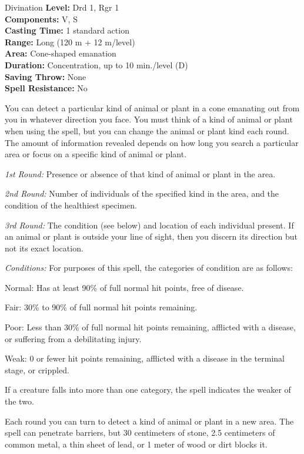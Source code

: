 {Divination}
{
	\textbf{Level:}
	Drd 1, Rgr 1\\
	\textbf{Components:}
	V, S\\
	\textbf{Casting Time:}
	1 standard action\\
	\textbf{Range:}
	Long (120 m + 12 m/level)\\
	\textbf{Area:}
	Cone-shaped emanation\\
	\textbf{Duration:}
	Concentration, up to 10 min./level (D)\\
	\textbf{Saving Throw:}
	None\\
	\textbf{Spell Resistance:}
	No\\
}
{
	You can detect a particular kind of animal or plant in a cone emanating out from you in whatever direction you face. You must think of a kind of animal or plant when using the spell, but you can change the animal or plant kind each round. The amount of information revealed depends on how long you search a particular area or focus on a specific kind of animal or plant.

	\textit{1st Round:}
	Presence or absence of that kind of animal or plant in the area.

	\textit{2nd Round:}
	Number of individuals of the specified kind in the area, and the condition of the healthiest specimen.

	\textit{3rd Round:}
	The condition (see below) and location of each individual present. If an animal or plant is outside your line of sight, then you discern its direction but not its exact location.

	\textit{Conditions:}
	For purposes of this spell, the categories of condition are as follows:

	Normal:
	Has at least 90\% of full normal hit points, free of disease.

	Fair:
	30\% to 90\% of full normal hit points remaining.

	Poor:
	Less than 30\% of full normal hit points remaining, afflicted with a disease, or suffering from a debilitating injury.

	Weak:
	0 or fewer hit points remaining, afflicted with a disease in the terminal stage, or crippled.

	If a creature falls into more than one category, the spell indicates the weaker of the two.

	Each round you can turn to detect a kind of animal or plant in a new area. The spell can penetrate barriers, but 30 centimeters of stone, 2.5 centimeters of common metal, a thin sheet of lead, or 1 meter of wood or dirt blocks it.

}

